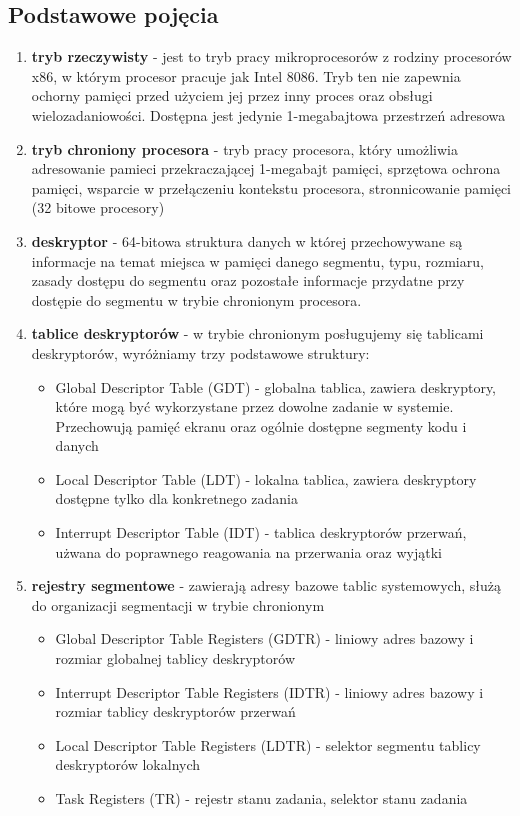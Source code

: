\documentclass[a4paper,12pt]{article}
\begin{document}
	\subsection{Podstawowe pojęcia}
\begin{enumerate}
				\item{\textbf{tryb rzeczywisty} - jest to tryb pracy mikroprocesorów z rodziny procesorów x86, w którym procesor pracuje jak Intel 8086. Tryb ten nie zapewnia ochorny pamięci przed użyciem jej przez inny proces oraz obsługi wielozadaniowości. Dostępna jest jedynie 1-megabajtowa przestrzeń adresowa}

				\item{\textbf{tryb chroniony procesora} - tryb pracy procesora, który umożliwia adresowanie pamieci przekraczającej 1-megabajt pamięci, sprzętowa ochrona pamięci, wsparcie w przełączeniu kontekstu procesora, stronnicowanie pamięci (32 bitowe procesory) }

				\item{\textbf{deskryptor} - 64-bitowa struktura danych w której przechowywane są informacje na temat miejsca w pamięci danego segmentu, typu, rozmiaru, zasady dostępu do segmentu oraz pozostałe informacje przydatne przy dostępie do segmentu w trybie chronionym procesora. }

				\item{\textbf{tablice deskryptorów} - w trybie chronionym posługujemy się tablicami deskryptorów, wyróżniamy trzy podstawowe struktury: }
\begin{itemize}
						\item{Global Descriptor Table (GDT) - globalna tablica, zawiera deskryptory, które mogą być wykorzystane przez dowolne zadanie w systemie. Przechowują pamięć ekranu oraz ogólnie dostępne segmenty kodu i danych}
						\item{Local Descriptor Table (LDT) - lokalna tablica, zawiera deskryptory dostępne tylko dla konkretnego zadania}
						\item{Interrupt Descriptor Table (IDT) - tablica deskryptorów przerwań, użwana do poprawnego reagowania na przerwania oraz wyjątki}
					\end{itemize}

\item{\textbf{rejestry segmentowe} - zawierają adresy bazowe tablic systemowych, służą do organizacji segmentacji w trybie chronionym}
\begin{itemize}
\item{Global Descriptor Table Registers (GDTR) - liniowy adres bazowy i rozmiar globalnej tablicy deskryptorów}
\item{Interrupt Descriptor Table Registers (IDTR) - liniowy adres bazowy i rozmiar tablicy deskryptorów przerwań}
\item{Local Descriptor Table Registers (LDTR) - selektor segmentu tablicy deskryptorów lokalnych}
\item{Task Registers (TR) - rejestr stanu zadania, selektor stanu zadania}
\end{itemize}



\end{enumerate}
\end{document}
